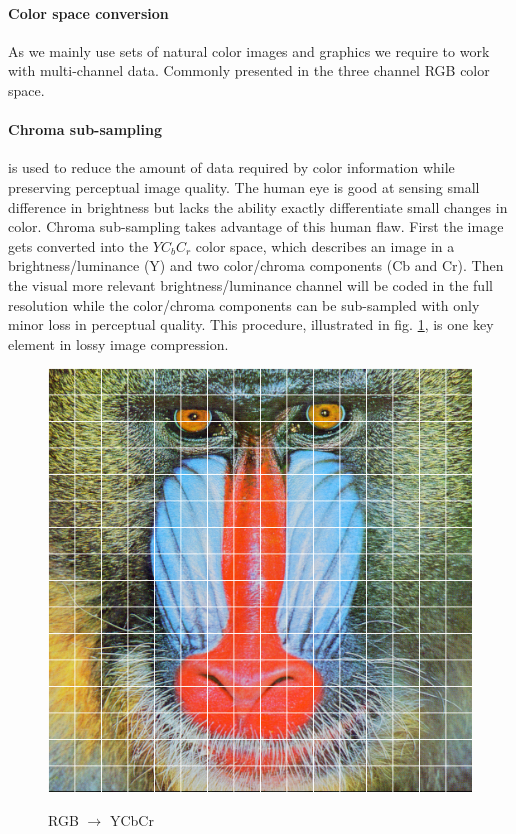 
\paragraph{Color space conversion} As we mainly use sets of natural color images
and graphics we require to work with multi-channel data. Commonly presented in
the three channel RGB color space. 

\paragraph{Chroma sub-sampling} is used to reduce the amount of data required by
color information while preserving perceptual image quality. 
The human eye is good at sensing small difference in brightness but lacks the
ability exactly differentiate small changes in color. Chroma sub-sampling takes
advantage of this human flaw. First the image gets converted into the $YC_bC_r$
color space, which describes an image in a brightness/luminance (Y) and two
color/chroma components (Cb and Cr). Then the visual more relevant
brightness/luminance channel will be coded in the full resolution while the
color/chroma components can be sub-sampled with only minor loss in perceptual
quality. This procedure, illustrated in fig. \ref{fig:YCbCr}, is one key element
in lossy image compression. 
\begin{figure}[h]
\centering
\includegraphics[scale = 0.25]{images/segmentation.png}
\label{fig:YCbCr}
\caption{RGB $\rightarrow$ YCbCr}
\end{figure}


